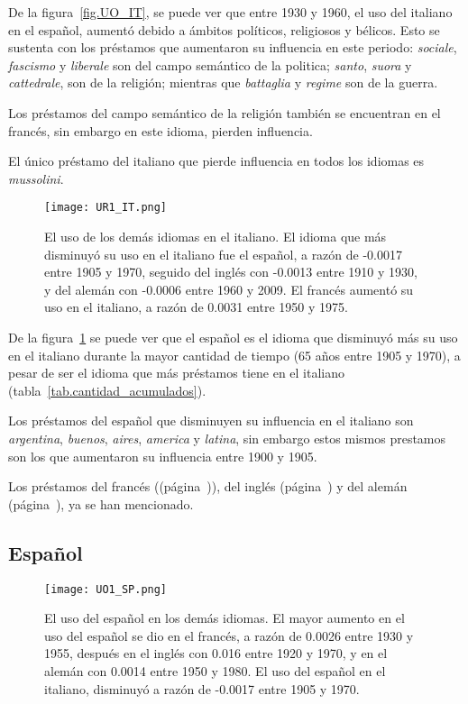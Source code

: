 De la figura~\ref{fig.UO_IT}, se puede ver que entre 1930 y 1960, el uso del italiano en el español, aumentó debido a ámbitos políticos, religiosos y bélicos. Esto se sustenta con los préstamos que aumentaron su influencia en este periodo:  \textit{sociale}, \textit{fascismo } y \textit{liberale} son del campo semántico de la politica; \textit{santo}, \textit{suora} y  \textit{cattedrale}, son de la religión; mientras que \textit{battaglia}  y \textit{regime} son de la guerra.
		
Los préstamos del campo semántico de la religión también se encuentran en el francés, sin embargo  en este idioma, pierden influencia. 

El único préstamo del italiano que pierde influencia en todos los idiomas es \textit{mussolini}.
\label{IT-D}

\begin{figure}[h!]
	\centering
	\texttt{[image: UR1\_IT.png]}
	\caption{El uso de los demás idiomas en el italiano. El idioma que más 
	disminuyó su uso en el italiano fue el español, a razón de -0.0017  entre 1905 y 1970, seguido del inglés con -0.0013 entre 1910 y 1930, y del alemán con -0.0006 entre 1960 y 2009. El francés aumentó su uso en el italiano, a razón de 0.0031 entre 1950 y 1975.}
	\label{fig.UR_IT}
\end{figure}

De la figura~\ref{fig.UR_IT} se puede ver que el español es el idioma que disminuyó más su uso en el italiano durante la mayor cantidad de tiempo (65 años entre 1905 y 1970), a pesar de ser el idioma que más préstamos tiene en el italiano (tabla~\ref{tab.cantidad_acumulados}). 

Los préstamos del español que disminuyen su influencia en el italiano son \textit{argentina}, \textit{buenos}, \textit{aires}, \textit{america} y \textit{latina}, sin embargo estos mismos prestamos son los que aumentaron su influencia entre 1900 y 1905. 

Los préstamos del francés ((página~\pageref{FR-D})), del inglés (página~\pageref{EN-D}) y del alemán (página~\pageref{GE-D}), ya se han mencionado. 
\label{DE-IT}



\subsection{Español} %
\begin{figure}[h!] %
	\centering
	\texttt{[image: UO1\_SP.png]}
	\caption{El uso del español en los demás idiomas. El mayor aumento en el uso del español se dio en el francés, a razón de 0.0026 entre 1930 y 1955, después en el inglés con 0.016 entre 1920 y 1970,  y en el alemán con 0.0014 entre 1950 y 1980. El uso del español en el italiano, disminuyó a razón de -0.0017 entre 1905 y 1970.}
	\label{fig.UO_SP}
	
\end{figure} %

